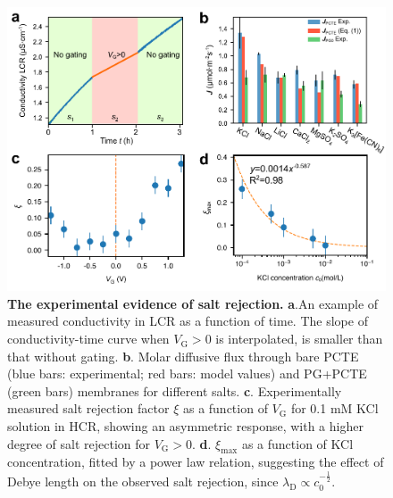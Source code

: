 \documentclass[journal=nalefd,email=true, hyperref=true, keywords=false]{achemso}
\begin{document}
\begin{figure}[H]
  \centering
  \includegraphics[width=0.95\linewidth]{img/fig2.pdf}
  \caption{\textbf{The experimental evidence of salt rejection.}
    \textbf{a}.An example of measured conductivity in LCR as a
    function of time. The slope of conductivity-time curve when
    $V_{\mathrm{G}}>0$ is interpolated, is smaller than that without
    gating. \textbf{b}. Molar diffusive flux through bare PCTE (blue
    bars: experimental; red bars: model values) and PG+PCTE (green
    bars) membranes for different salts. \textbf{c}. Experimentally
    measured salt rejection factor $\xi$ as a function of
    $V_{\mathrm{G}}$ for 0.1 mM KCl solution in HCR, showing an
    asymmetric response, with a higher degree of salt rejection for
    $V_{\mathrm{G}}>0$. \textbf{d}. $\xi_{\mathrm{max}}$ as a function
    of KCl concentration, fitted by a power law relation, suggesting
    the effect of Debye length on the observed salt rejection, since
    $\lambda_{\mathrm{D}} \propto c_{0}^{-\frac{1}{2}}$.}
  \label{fig:2} 
\end{figure}
\end{document}
